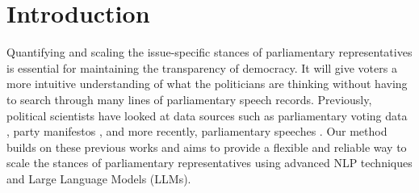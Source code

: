 \documentclass[final,5p,times,twocolumn,authoryear]{elsarticle}
\begin{document}






\onecolumn
\tableofcontents
\newpage
\listoffigures
\newpage
\listoftables

\twocolumn
{}

\section{Introduction}
Quantifying and scaling the issue-specific stances of parliamentary representatives is essential for maintaining the transparency of democracy. It will give voters a more intuitive understanding of what the politicians are thinking without having to search through many lines of parliamentary speech records. Previously, political scientists have looked at data sources such as parliamentary voting data \citep{dw-nominate}, party manifestos \citep{CATALINAC_2018}, and more recently, parliamentary speeches \citep{Word-embeddings-for-analysis-of-ideological-placement}. Our method builds on these previous works and aims to provide a flexible and reliable way to scale the stances of parliamentary representatives using advanced NLP techniques and Large Language Models (LLMs).
\end{document}
